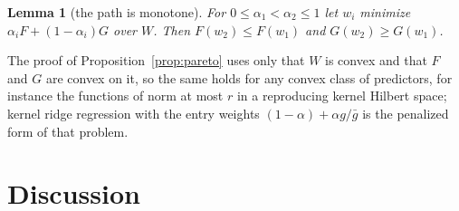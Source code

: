 \documentclass[11pt]{article}
\newtheorem{lemma}{Lemma}[section]
\theoremstyle{remark}
\newcommand{\1}{\mathbf{1}}
\begin{document}
\begin{lemma}[the path is monotone]\label{lem:monotone}
For $0\le\alpha_1<\alpha_2\le1$ let $w_i$ minimize $\alpha_iF+(1-\alpha_i)G$ over $W$. Then $F(w_2)\le F(w_1)$ and
$G(w_2)\ge G(w_1)$.
\end{lemma}

The proof of Proposition~\ref{prop:pareto} uses only that $W$ is convex and that $F$ and $G$ are convex on it, so the
same holds for any convex class of predictors, for instance the functions of norm at most $r$ in a reproducing kernel
Hilbert space; kernel ridge regression with the entry weights $(1-\alpha)+\alpha g/\bar g$ is the penalized form of
that problem.

\section{Discussion}\label{sec:discussion}
\end{document}
